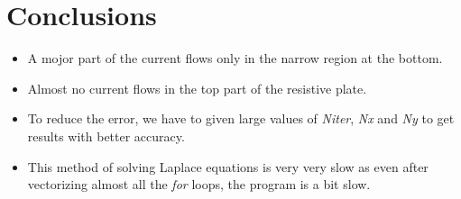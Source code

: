 \documentclass[11pt, a4paper]{article}
\begin{document}
\section{Conclusions}
\begin{itemize}
    \item A mojor part of the current flows only in the narrow region at the bottom.
    \item Almost no current flows in the top part of the resistive plate.
    \item To reduce the error, we have to given large values of \textit{Niter}, \textit{Nx} and \textit{Ny} to get results with better accuracy.
    \item This method of solving Laplace equations is very very slow as even after vectorizing almost all the \textit{for} loops, the program is a bit slow.
\end{itemize}
\end{document}
